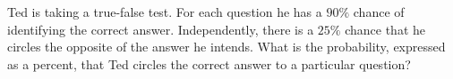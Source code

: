 Ted is taking a true-false test. For each question he has a $90\%$ chance of identifying the correct answer. Independently, there is a $25\%$ chance that he circles the opposite of the answer he intends. What is the probability, expressed as a percent, that Ted circles the correct answer to a particular question?
